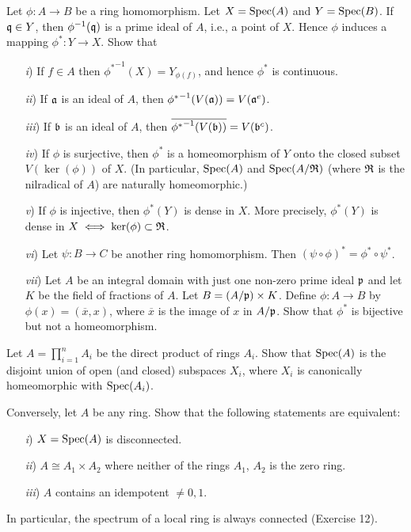 \documentclass[10pt]{amsart}
\begin{document}
\begin{exercise}
    Let $\phi: A \to B$ be a ring homomorphism. Let $X = \operatorname{Spec}(A)$ and $Y = \operatorname{Spec}(B)$. 
    If $\mathfrak{q} \in Y$, then $\phi^{-1}(\mathfrak{q})$ is a prime ideal of $A$, i.e., a point of 
    $X$. Hence $\phi$ induces a mapping $\phi^{*}: Y \to X$. Show that
    \begin{itemize}
        \item[\emph{i})] If $f \in A$ then ${\phi^{*}}^{-1}(X) = Y_{\phi(f)}$, and hence
        $\phi^{*}$ is continuous.
        \item[\emph{ii})] If $\mathfrak{a}$ is an ideal of $A$, then ${\phi^{*}}^{-1}(V(\mathfrak{a})) = V(\mathfrak{a}^e)$.
        \item[\emph{iii})] If $\mathfrak{b}$ is an ideal of $A$, then $\overline{{\phi^{*}}^{-1}(V(\mathfrak{b}))} = V(\mathfrak{b}^c)$.
        \item[\emph{iv})] If $\phi$ is surjective, then $\phi^{*}$ is a homeomorphism of $Y$ onto the closed subset 
        $V(\ker(\phi))$ of $X$. (In particular, $\operatorname{Spec}(A)$ and $\operatorname{Spec}(A/\mathfrak{R})$ (where $\mathfrak{R}$ is the nilradical of $A$) are naturally homeomorphic.)
        \item[\emph{v})] If $\phi$ is injective, then $\phi^{*}(Y)$ is dense in $X$. More precisely, $\phi^{*}(Y)$ is dense in $X \iff  \ker(\phi) \subset \mathfrak{R}$.
        \item[\emph{vi})] Let $\psi: B \to C$ be another ring homomorphism. Then $(\psi \circ \phi)^{*} = \phi^{*} \circ \psi^{*}$.
        \item[\emph{vii})] Let $A$ be an integral domain with just one non-zero prime ideal $\mathfrak{p}$ and let $K$ be the field of fractions of $A$. 
        Let $B = (A/\mathfrak{p}) \times K$. Define $\phi: A \to B$ by $\phi(x) = (\overline{x}, x)$, 
        where $\overline{x}$ is the image of $x$ in $A/\mathfrak{p}$. Show that $\phi^{*}$ is bijective
        but not a homeomorphism.
    \end{itemize}
\end{exercise}

\begin{exercise}
    Let $A = \prod_{i = 1}^{n} A_i$ be the direct product of rings $A_i$. 
    Show that $\operatorname{Spec}(A)$ is the disjoint union of open (and closed) subspaces $X_i$, where $X_i$ is 
    canonically homeomorphic with $\operatorname{Spec} (A_i)$.

    Conversely, let $A$ be any ring. Show that the following statements are equivalent:
    \begin{itemize}
        \item[\emph{i})] $X = \operatorname{Spec}(A)$ is disconnected.
        \item[\emph{ii})] $A \cong A_1 \times A_2$ where neither of the rings $A_1$, $A_2$ is the zero ring.
        \item[\emph{iii})] $A$ contains an idempotent $\ne 0, 1$. 
    \end{itemize}
    In particular, the spectrum of a local ring is always connected (Exercise 12).
\end{exercise}
\end{document}
